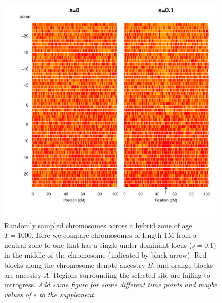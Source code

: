 \documentclass[11pt,letterpaper]{article}
\newcommand{\plr}[1]{{\em \color{blue} #1}}
\begin{document}
\begin{figure}
\includegraphics[width=\textwidth]{figs/plot_chromosomes_tau1000}
\caption{Randomly sampled chromosomes  across a hybrid zone of age $T=1000$. Here we compare chromosomes of length 1M from a neutral zone to one that has a single under-dominant locus ($s=0.1$) in the middle of the chromosome (indicated by black arrow). Red blocks along the chromosome denote ancestry $B$, and orange blocks are ancestry $A$. Regions surrounding the selected site are failing to introgress.
    \plr{Add same figure for some different time points and maybe values of $s$ to the supplement.} 
}\label{Fig:resistanceToIntrogression1000g}
\end{figure}
\end{document}
